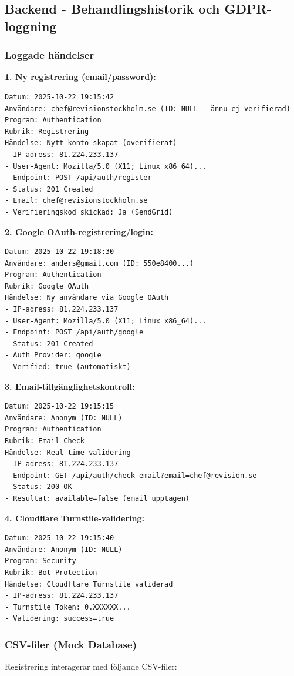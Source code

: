 \documentclass[12pt,a4paper]{article}
\begin{document}
\subsection{Backend - Behandlingshistorik och GDPR-loggning}

\subsubsection{Loggade händelser}

\textbf{1. Ny registrering (email/password):}
\begin{verbatim}
Datum: 2025-10-22 19:15:42
Användare: chef@revisionstockholm.se (ID: NULL - ännu ej verifierad)
Program: Authentication
Rubrik: Registrering
Händelse: Nytt konto skapat (overifierat)
- IP-adress: 81.224.233.137
- User-Agent: Mozilla/5.0 (X11; Linux x86_64)...
- Endpoint: POST /api/auth/register
- Status: 201 Created
- Email: chef@revisionstockholm.se
- Verifieringskod skickad: Ja (SendGrid)
\end{verbatim}

\textbf{2. Google OAuth-registrering/login:}
\begin{verbatim}
Datum: 2025-10-22 19:18:30
Användare: anders@gmail.com (ID: 550e8400...)
Program: Authentication
Rubrik: Google OAuth
Händelse: Ny användare via Google OAuth
- IP-adress: 81.224.233.137
- User-Agent: Mozilla/5.0 (X11; Linux x86_64)...
- Endpoint: POST /api/auth/google
- Status: 201 Created
- Auth Provider: google
- Verified: true (automatiskt)
\end{verbatim}

\textbf{3. Email-tillgänglighetskontroll:}
\begin{verbatim}
Datum: 2025-10-22 19:15:15
Användare: Anonym (ID: NULL)
Program: Authentication
Rubrik: Email Check
Händelse: Real-time validering
- IP-adress: 81.224.233.137
- Endpoint: GET /api/auth/check-email?email=chef@revision.se
- Status: 200 OK
- Resultat: available=false (email upptagen)
\end{verbatim}

\textbf{4. Cloudflare Turnstile-validering:}
\begin{verbatim}
Datum: 2025-10-22 19:15:40
Användare: Anonym (ID: NULL)
Program: Security
Rubrik: Bot Protection
Händelse: Cloudflare Turnstile validerad
- IP-adress: 81.224.233.137
- Turnstile Token: 0.XXXXXX...
- Validering: success=true
\end{verbatim}

\subsubsection{CSV-filer (Mock Database)}
Registrering interagerar med följande CSV-filer:
\end{document}
